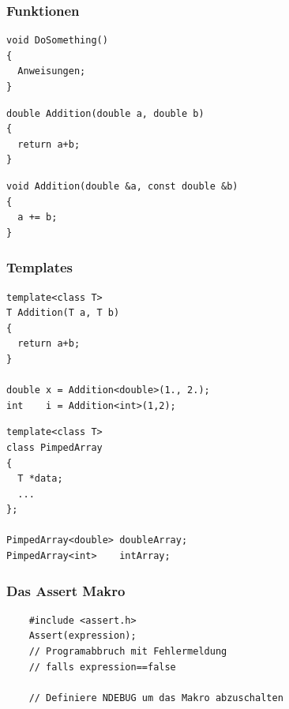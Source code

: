 \documentclass[10pt]{beamer}
\begin{document}
\begin{frame}[fragile]
  \frametitle{Funktionen}
\begin{lstlisting}
void DoSomething()
{
  Anweisungen;
}
\end{lstlisting}
\begin{lstlisting}
double Addition(double a, double b)
{
  return a+b;
}

\end{lstlisting}
\begin{lstlisting}
void Addition(double &a, const double &b)
{
  a += b;
}
\end{lstlisting}
\end{frame}



\begin{frame}[fragile]
  \frametitle{Templates}
  \begin{lstlisting}
template<class T>
T Addition(T a, T b)
{
  return a+b;
}

double x = Addition<double>(1., 2.);
int    i = Addition<int>(1,2);
  \end{lstlisting}

  \begin{lstlisting}
template<class T>
class PimpedArray
{
  T *data;
  ...
};

PimpedArray<double> doubleArray;
PimpedArray<int>    intArray;
  \end{lstlisting}
\end{frame}


\begin{frame}[fragile]
  \frametitle{Das Assert Makro}
  \begin{lstlisting}    
    #include <assert.h>
    Assert(expression); 
    // Programabbruch mit Fehlermeldung 
    // falls expression==false
    
    // Definiere NDEBUG um das Makro abzuschalten
  \end{lstlisting}
\end{frame}
\end{document}
